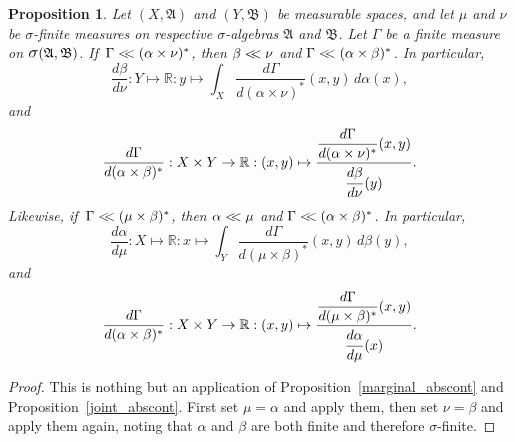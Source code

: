 \documentclass[
twoside=true,
paper=letter,
fontsize=11pt,
pagesize=auto,
leqno,
openany,
headsepline,
overfullrule,
]{scrbook}
\theoremstyle{plain}
\theoremstyle{plain}
\newtheorem{prop}[thm]{Proposition}
\theoremstyle{definition}
\theoremstyle{bfnoteitalic}
\theoremstyle{bfnoteroman}
\newcommand{\sigalg}[1]{\mathfrak{#1}}
\newcommand{\sagb}{\mathop{\hbox{\large{$\sigma$}}}\nolimits}
\newcommand{\textsigma}{\hbox{\large{$\sigma$}}\kern-1pt}
\newcommand{\R}{\mathbb{R}}
\newcommand{\sigmaalgebra}{\sigalg{A}}
\newcommand{\sigmaalgebraii}{\sigalg{B}}
\newcommand{\productsig}[2]{\sagb(#1,#2)}
\newcommand{\lilstrut}{\vphantom{\bigl(}}
\newcommand{\measurespace}{X}
\newcommand{\measurespaceii}{Y}
\newcommand{\mspaceelt}{x}
\newcommand{\mspaceeltii}{y}
\newcommand{\abscont}{\mathrel{< \kern-3.5pt <}}
\newcommand{\measure}{\mu}
\newcommand{\measmu}{\mu}
\newcommand{\measureii}{\nu}
\newcommand{\measnu}{\nu}
\newcommand{\joint}{\Gamma}%
\newcommand{\measonprod}{\Gamma}%
\newcommand{\marginalone}{\alpha}%
\newcommand{\marginaltwo}{\beta}%
\begin{document}
\begin{prop}\label{mixed_abscont}
Let
$(\measurespace, \sigmaalgebra)$
and
$(\measurespaceii, \sigmaalgebraii)$
be measurable spaces, and let $\measure$ and $\measureii$
be \textsigma-finite measures on  respective \textsigma-algebras
$\sigmaalgebra$ and $\sigmaalgebraii$.
Let $\measonprod$ be a finite measure on
$\productsig{\sigmaalgebra}{\sigmaalgebraii}$.
If\,
$\measonprod \abscont (\marginalone\times\measnu)^*$, then
$\marginaltwo\abscont\measnu$ and
$\measonprod\abscont(\marginalone\times\marginaltwo)^*$. In particular,
\[
\frac{d\marginaltwo}{d\measnu}
: \measurespaceii \mapsto\R
:\mspaceeltii\mapsto
\int_\measurespace
\dfrac{d\measonprod}{d(\marginalone\times\measnu)^*}(\mspaceelt,\mspaceeltii)
\, d\marginalone(\mspaceelt),
\]
and
\[
\frac{d\measonprod}{d(\marginalone\times\marginaltwo)^*}
: \measurespace\times\measurespaceii
\to \R
: (\mspaceelt,\mspaceeltii)\mapsto
\frac{\dfrac{d\measonprod}{d(\marginalone\times\measnu)^*}
(\mspaceelt,\mspaceeltii)}
{\dfrac{d\marginaltwo\lilstrut}{d\measnu}(\mspaceeltii)}.
\]
Likewise,
if\,
$\measonprod \abscont (\measmu\times\marginaltwo)^*$, then
$\marginalone\abscont\measmu$ and
$\measonprod\abscont(\marginalone\times\marginaltwo)^*$. In particular,
\[
\frac{d\marginalone}{d\measmu}
: \measurespace \mapsto\R
:\mspaceelt\mapsto
\int_\measurespaceii
\dfrac{d\measonprod}{d(\measmu\times\marginaltwo)^*}(\mspaceelt,\mspaceeltii)
\, d\marginaltwo(\mspaceeltii),
\]
and
\[
\frac{d\measonprod}{d(\marginalone\times\marginaltwo)^*}
: \measurespace\times\measurespaceii
\to \R
: (\mspaceelt,\mspaceeltii)\mapsto
\frac{\dfrac{d\joint}{d(\measmu\times\marginaltwo)^*}
(\mspaceelt,\mspaceeltii)}
{\dfrac{d\marginalone\lilstrut}{d\measmu}(\mspaceelt)}.
\]
\end{prop}


\begin{proof}
This is nothing but an application of Proposition~\ref{marginal_abscont} and Proposition~\ref{joint_abscont}. First set $\measmu=\marginalone$ and apply them, then set $\measnu=\marginaltwo$ and apply them again, noting that $\marginalone$ and $\marginaltwo$ are both finite and therefore \textsigma\hyp{}finite.
\end{proof}
\end{document}

